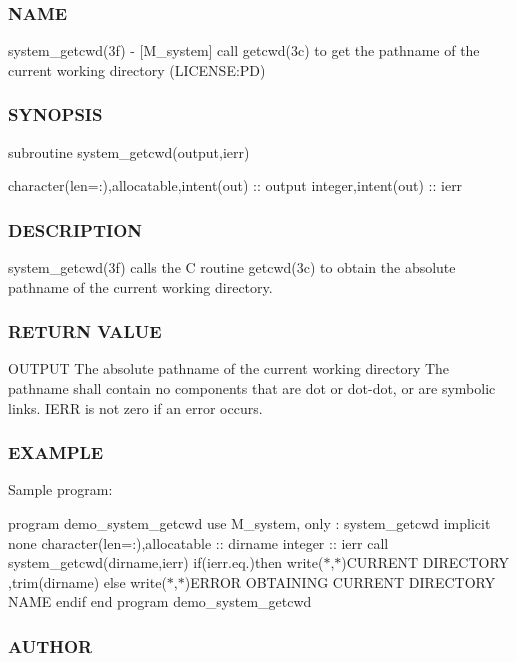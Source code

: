\subsubsection*{N\+A\+ME}

system\+\_\+getcwd(3f) -\/ \mbox{[}M\+\_\+system\mbox{]} call getcwd(3c) to get the pathname of the current working directory (L\+I\+C\+E\+N\+SE\+:PD) \subsubsection*{S\+Y\+N\+O\+P\+S\+IS}

subroutine system\+\_\+getcwd(output,ierr)

character(len=\+:),allocatable,intent(out) \+:\+: output integer,intent(out) \+:\+: ierr \subsubsection*{D\+E\+S\+C\+R\+I\+P\+T\+I\+ON}

system\+\_\+getcwd(3f) calls the C routine getcwd(3c) to obtain the absolute pathname of the current working directory.

\subsubsection*{R\+E\+T\+U\+RN V\+A\+L\+UE}

O\+U\+T\+P\+UT The absolute pathname of the current working directory The pathname shall contain no components that are dot or dot-\/dot, or are symbolic links. I\+E\+RR is not zero if an error occurs.

\subsubsection*{E\+X\+A\+M\+P\+LE}

Sample program\+:

program demo\+\_\+system\+\_\+getcwd use M\+\_\+system, only \+: system\+\_\+getcwd implicit none character(len=\+:),allocatable \+:\+: dirname integer \+:\+: ierr call system\+\_\+getcwd(dirname,ierr) if(ierr.\+eq.)then write($\ast$,$\ast$)\textquotesingle{}C\+U\+R\+R\+E\+NT D\+I\+R\+E\+C\+T\+O\+RY \textquotesingle{},trim(dirname) else write($\ast$,$\ast$)\textquotesingle{}E\+R\+R\+OR O\+B\+T\+A\+I\+N\+I\+NG C\+U\+R\+R\+E\+NT D\+I\+R\+E\+C\+T\+O\+RY N\+A\+ME\textquotesingle{} endif end program demo\+\_\+system\+\_\+getcwd

\subsubsection*{A\+U\+T\+H\+OR}

